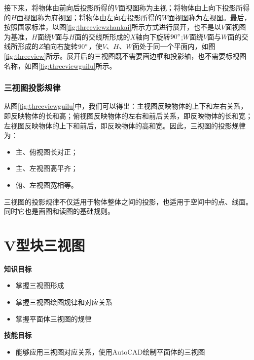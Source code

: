 接下来，将物体由前向后投影所得的$V$面视图称为主视；将物体由上向下投影所得的$H$面视图称为府视图；将物体由左向右投影所得的$W$面视图称为左视图。最后，按照国家标准，以图\ref{fig:threeviewzhankai}所示方式进行展开，也不是以$V$面视图为基准，$H$面绕$V$面与$H$面的交线所形成的$X$轴向下旋转$90\degree$;$W$面绕$V$面与$W$面的交线所形成的$Z$轴向右旋转$90\degree$，使$V$、$H$、$W$面处于同一个平面内，如图\ref{fig:threeview}所示。展开后的三视图既不需要画边框和投影轴，也不需要标视图名称，如图\ref{fig:threeviewguilu}所示。
\subsubsection{三视图投影规律}
从图\ref{fig:threeviewguilu}中，我们可以得出：主视图反映物体的上下和左右关系，即反映物体的长和高；俯视图反映物体的左右和前后关系，即反映物体的长和宽；左视图反映物体的上下和前后，即反映物体的高和宽。因此，三视图的投影规律为：
\begin{itemize}
\item 主、俯视图长对正；
\item 主、左视图高平齐；
\item 俯、左视图宽相等。
\end{itemize}

三视图的投影规律不仅适用于物体整体之间的投影，也适用于空间中的点、线面。同时它也是画图和读图的基础规则。
\clearpage

\section{V型块三视图}
{\bfseries 知识目标}
\begin{itemize}
\item 掌握三视图形成
\item 掌握三视图绘图规律和对应关系
\item 掌握平面体三视图的规律
\end{itemize}

{\bfseries 技能目标}
\begin{itemize}
\item 能够应用三视图对应关系，使用AutoCAD绘制平面体的三视图
\end{itemize}

